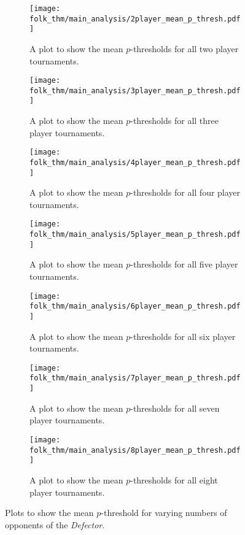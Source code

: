 \begin{figure}
    \begin{subfigure}{.45\textwidth}
        \centering
        \texttt{[image: folk\_thm/main\_analysis/2player\_mean\_p\_thresh.pdf]}
        \caption{A plot to show the mean \(p\)-thresholds for all two player tournaments.}\label{subfig:2player_mean_p_thresh}
    \end{subfigure}
    \begin{subfigure}{.45\textwidth}
        \centering
        \texttt{[image: folk\_thm/main\_analysis/3player\_mean\_p\_thresh.pdf]}
        \caption{A plot to show the mean \(p\)-thresholds for all three player tournaments.}\label{subfig:3player_mean_p_thresh}
    \end{subfigure}
    

    \newline


    \begin{subfigure}{.3\textwidth}
        \centering
        \texttt{[image: folk\_thm/main\_analysis/4player\_mean\_p\_thresh.pdf]}
        \caption{A plot to show the mean \(p\)-thresholds for all four player tournaments.}\label{subfig:4player_mean_p_thresh}
    \end{subfigure}
    \begin{subfigure}{.3\textwidth}
        \centering
        \texttt{[image: folk\_thm/main\_analysis/5player\_mean\_p\_thresh.pdf]}
        \caption{A plot to show the mean \(p\)-thresholds for all five player tournaments.}\label{subfig:5player_mean_p_thresh}
    \end{subfigure}
    \begin{subfigure}{.3\textwidth}
        \centering
        \texttt{[image: folk\_thm/main\_analysis/6player\_mean\_p\_thresh.pdf]}
        \caption{A plot to show the mean \(p\)-thresholds for all six player tournaments.}\label{subfig:6player_mean_p_thresh}
    \end{subfigure}


    \newline


    \begin{subfigure}{.45\textwidth}
        \centering
        \texttt{[image: folk\_thm/main\_analysis/7player\_mean\_p\_thresh.pdf]}
        \caption{A plot to show the mean \(p\)-thresholds for all seven player tournaments.}\label{subfig:7player_mean_p_thresh}
    \end{subfigure}
    \begin{subfigure}{.45\textwidth}
        \centering
        \texttt{[image: folk\_thm/main\_analysis/8player\_mean\_p\_thresh.pdf]}
        \caption{A plot to show the mean \(p\)-thresholds for all eight player tournaments.}\label{subfig:8player_mean_p_thresh}
    \end{subfigure}
    \caption{Plots to show the mean \(p\)-threshold for varying numbers of opponents of the \textit{Defector}.}\label{fig:player_mean_p_thresh}
\end{figure}


